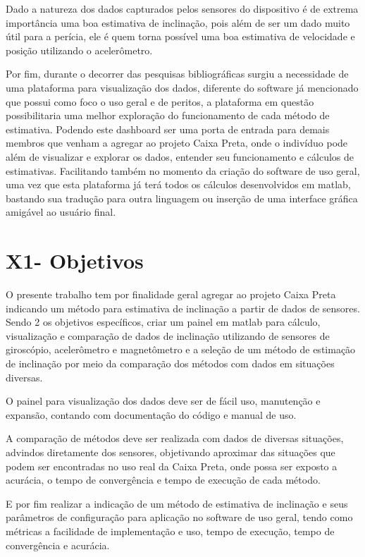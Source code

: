 Dado a natureza dos dados capturados pelos sensores do dispositivo é de extrema importância uma boa estimativa de inclinação, pois além de ser um dado muito útil para a perícia, ele é quem torna possível uma boa estimativa de velocidade e posição utilizando o acelerômetro.

Por fim, durante o decorrer das pesquisas bibliográficas surgiu a necessidade de uma plataforma para visualização dos dados, diferente do software já mencionado que possui como foco o uso geral e de peritos, a plataforma em questão possibilitaria uma melhor exploração do funcionamento de cada método de estimativa. Podendo este dashboard ser uma porta de entrada para demais membros que venham a agregar ao projeto Caixa Preta, onde o indivíduo pode além de visualizar e explorar os dados, entender seu funcionamento e cálculos de estimativas. Facilitando também no momento da criação do software de uso geral, uma vez que esta plataforma já terá todos os cálculos desenvolvidos em matlab, bastando sua tradução para outra linguagem ou inserção de uma interface gráfica amigável ao usuário final.


\section{X1- Objetivos}
O presente trabalho tem por finalidade geral agregar ao projeto Caixa Preta indicando um método para estimativa de inclinação a partir de dados de sensores. Sendo 2 os objetivos específicos, criar um painel em matlab para cálculo, visualização e comparação de dados de inclinação utilizando de sensores de giroscópio, acelerômetro e magnetômetro e a seleção de um método de estimação de inclinação por meio da comparação dos métodos com dados em situações diversas.

O painel para visualização dos dados deve ser de fácil uso, manutenção e expansão, contando com documentação do código e manual de uso.

A comparação de métodos deve ser realizada com dados de diversas situações, advindos diretamente dos sensores, objetivando aproximar das situações que podem ser encontradas no uso real da Caixa Preta, onde possa ser exposto a acurácia, o tempo de convergência e tempo de execução de cada método.

E por fim realizar a indicação de um método de estimativa de inclinação e seus parâmetros de configuração para aplicação no software de uso geral, tendo como métricas a facilidade de implementação e uso, tempo de execução, tempo de convergência e acurácia.

